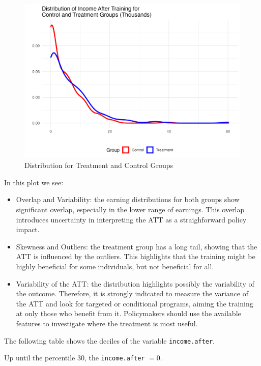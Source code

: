 \documentclass{article}
\begin{document}
\begin{figure}[H]
    \centering
    \includegraphics[width=\textwidth]{distribution_of_income_after_training_for_treatment_and_control.png}
    \caption{Distribution for Treatment and Control Groups}
    \label{fig:your_image_label}
\end{figure}

In this plot we see:
\begin{itemize}
    \item Overlap and Variability: the earning distributions for both groups show significant overlap, especially in the lower range of earnings. This overlap introduces uncertainty in interpreting the ATT as a straighforward policy impact.
    \item Skewness and Outliers: the treatment group has a long tail, showing that the ATT is influenced by the outliers. This highlights that the training might be highly beneficial for some individuals, but not beneficial for all.
    \item Variability of the ATT: the distribution highlights possibly the variability of the outcome. Therefore, it is strongly indicated to measure the variance of the ATT and look for targeted or conditional programs, aiming the training at only those who benefit from it. Policymakers should use the available features to investigate where the treatment is most useful.
\end{itemize}

The following table shows the deciles of the variable \texttt{income.after}.

Up until the percentile 30, the \texttt{income.after} $= 0$.
\end{document}
